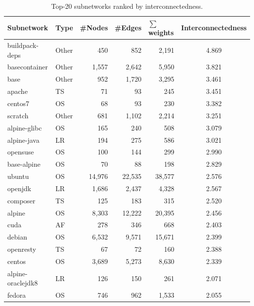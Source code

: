 \documentclass[sigconf]{acmart}
\begin{document}
\begin{table}[htbp]
  \centering
	\small
	\renewcommand\tabcolsep{2pt}
  \caption{Top-20 subnetworks ranked by interconnectedness.}\vspace{-0.3cm}
    \begin{tabular}{llrrrc}
   \toprule
    Subnetwork & Type  & \multicolumn{1}{l}{\#Nodes} & \multicolumn{1}{l}{\#Edges} & \multicolumn{1}{l}{$\sum$weights} & \multicolumn{1}{l}{Interconnectedness} \\
\midrule
    buildpack-deps & Other & 450   & 852   & 2,191  & 4.869  \\
    basecontainer & Other & 1,557  & 2,642  & 5,950  & 3.821  \\
    base  & Other & 952   & 1,720  & 3,295  & 3.461  \\
    apache & TS   & 71    & 93    & 245   & 3.451  \\
    centos7 & OS    & 68    & 93    & 230   & 3.382  \\
    scratch & Other & 681   & 1,102  & 2,214  & 3.251  \\
    alpine-glibc & OS    & 165   & 240   & 508   & 3.079  \\
    alpine-java & LR    & 194   & 275   & 586   & 3.021  \\
    opensuse & OS    & 100   & 144   & 299   & 2.990  \\
    base-alpine & OS    & 70    & 88    & 198   & 2.829  \\
    ubuntu & OS    & 14,976  & 22,535  & 38,577  & 2.576  \\
    openjdk & LR    & 1,686  & 2,437  & 4,328  & 2.567  \\
    composer & TS   & 125   & 183   & 315   & 2.520  \\
    alpine & OS    & 8,303  & 12,222  & 20,395  & 2.456  \\
    cuda  & AF  & 278   & 346   & 668   & 2.403  \\
    debian & OS    & 6,532  & 9,571  & 15,671  & 2.399  \\
    openresty & TS   & 67    & 72    & 160   & 2.388  \\
    centos & OS    & 3,689  & 5,273  & 8,630  & 2.339  \\
    alpine-oraclejdk8 & LR    & 126   & 150   & 261   & 2.071  \\
    fedora & OS    & 746   & 962   & 1,533  & 2.055  \\
\bottomrule
    \end{tabular}%
  \label{tab:subnetworks}%
\end{table}%
\end{document}
